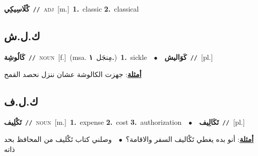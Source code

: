 \documentclass[10pt,a4paper,twoside]{article} %
\begin{document}
\begin{multicols}{2}
{\setlength\topsep{0pt}\textbf{\foreignlanguage{arabic}{كْلَاسِيكِي}}\ {\color{gray}\texttt{//}\color{black}}\ \textsc{adj}\ [m.]\ \textbf{1.}~classic  \textbf{2.}~classical\ } \vspace{2mm}

\vspace{-3mm}
\subsection*{\color{blue}\foreignlanguage{arabic}{ك.ل.ش}\color{blue}{}} 

{\setlength\topsep{0pt}\textbf{\foreignlanguage{arabic}{كَالُوشِة}}\ {\color{gray}\texttt{//}\color{black}}\ \textsc{noun}\ [f.]\ \color{gray}(msa. \foreignlanguage{arabic}{مِنجَل}~\foreignlanguage{arabic}{\textbf{١.}})\color{black}\ \textbf{1.}~sickle\ \ $\bullet$\ \ \setlength\topsep{0pt}\textbf{\foreignlanguage{arabic}{كَوَاليش}}\ {\color{gray}\texttt{//}\color{black}}\ [pl.]\  \begin{flushright}\color{gray}\foreignlanguage{arabic}{\textbf{\underline{\foreignlanguage{arabic}{أمثلة}}}: جهزت الكالوشة عشان ننزل نحصد القمح}\end{flushright}\color{black}} \vspace{2mm}

\vspace{-3mm}
\subsection*{\color{blue}\foreignlanguage{arabic}{ك.ل.ف}\color{blue}{}} 

{\setlength\topsep{0pt}\textbf{\foreignlanguage{arabic}{تَكْلِيف}}\ {\color{gray}\texttt{//}\color{black}}\ \textsc{noun}\ [m.]\ \textbf{1.}~expense  \textbf{2.}~cost  \textbf{3.}~authorization\ \ $\bullet$\ \ \setlength\topsep{0pt}\textbf{\foreignlanguage{arabic}{تَكَالِيف}}\ {\color{gray}\texttt{//}\color{black}}\ [pl.]\  \begin{flushright}\color{gray}\foreignlanguage{arabic}{\textbf{\underline{\foreignlanguage{arabic}{أمثلة}}}: أنو بده يغطي تَكْاليف السفر والاقامة؟\ $\bullet$\ \  وصلني كتاب تَكْليف من المحافظ بحد ذاته}\end{flushright}\color{black}} \vspace{2mm}


\end{multicols}
\end{document}

